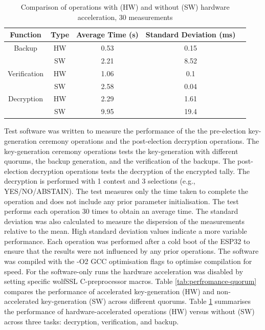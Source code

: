 \begin{table}[h!]
    \centering
    \begin{tabular}{|c|c|c|c|c|}
        \hline
        \textbf{Function} & \textbf{Type} & \textbf{Average Time (s)} & \textbf{Standard Deviation (ms)} \\
        \hline
        Backup & HW & 0.53 & 0.15 \\
        & SW & 2.21 & 8.52 \\
        \hline
        Verification & HW & 1.06 & 0.1 \\
        & SW & 2.58 & 0.04 \\
        \hline
        Decryption & HW & 2.29 & 1.61 \\
        & SW & 9.95 & 19.4 \\
        \hline
    \end{tabular}
    \caption{Comparison of operations with (HW) and without (SW) hardware acceleration, 30 measurements}
    \label{tab:perfromance}
\end{table}

Test software was written to measure the performance of the the pre-election key-generation ceremony operations and the post-election decryption operations. The key-generation ceremony operations tests the key-generation with different quorums, the backup generation, and the verification of the backups. The post-election decryption operations tests the decryption of the encrypted tally. The decryption is performed with 1 contest and 3 selections (e.g., YES/NO/ABSTAIN). The test measures only the time taken to complete the operation and does not include any prior parameter initialisation. The test performs each operation 30 times to obtain an average time. The standard deviation was also calculated to measure the dispersion of the measurements relative to the mean. High standard deviation values indicate a more variable performance. Each operation was performed after a cold boot of the ESP32 to ensure that the results were not influenced by any prior operations. The software was compiled with the -O2 GCC optimisation flags to optimise compilation for speed. For the software-only runs the hardware acceleration was disabled by setting specific wolfSSL C-preprocessor macros. Table \ref{tab:perfromance-quorum} compares the performance of accelerated key-generation (HW) and non-accelerated key-generation (SW) across different quorums. Table \ref{tab:perfromance} summarises the performance of hardware-accelerated operations (HW) versus without (SW) across three tasks: decryption, verification, and backup. 


